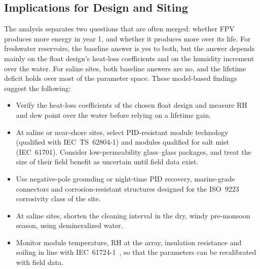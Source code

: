\documentclass[journal]{IEEEtran}
\begin{document}
\subsection{Implications for Design and Siting}
The analysis separates two questions that are often merged: whether FPV produces more energy in year 1, and whether it
produces more over its life. For freshwater reservoirs, the baseline answer is yes to both, but the answer depends
mainly on the float design's heat-loss coefficients and on the humidity increment over the water. For saline sites,
both baseline answers are no, and the lifetime deficit holds over most of the parameter space. These model-based
findings suggest the following:
\begin{itemize}
\item Verify the heat-loss coefficients of the chosen float design and measure RH and dew point over the water before
relying on a lifetime gain.
\item At saline or near-shore sites, select PID-resistant module technology (qualified with IEC~TS~62804-1) and modules
qualified for salt mist (IEC~61701). Consider low-permeability glass--glass packages, and treat the size of their field
benefit as uncertain until field data exist.
\item Use negative-pole grounding or night-time PID recovery, marine-grade connectors and corrosion-resistant
structures designed for the ISO~9223 corrosivity class of the site.
\item At saline sites, shorten the cleaning interval in the dry, windy pre-monsoon season, using demineralized water.
\item Monitor module temperature, RH at the array, insulation resistance and soiling in line with
IEC~61724-1~\cite{iec61724}, so that the parameters can be recalibrated with field data.
\end{itemize}
\end{document}
